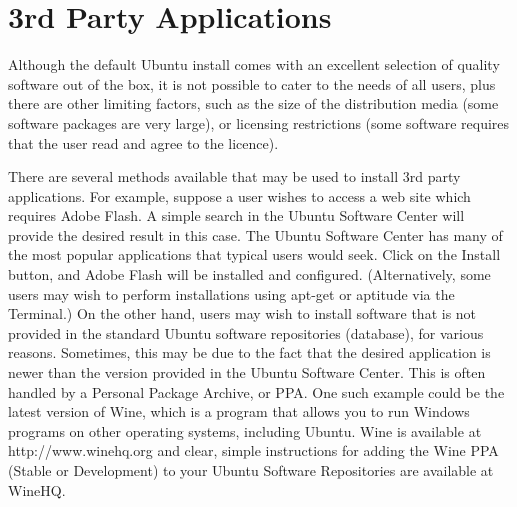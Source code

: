 \section{3rd Party Applications} \label{sect:3rdpartyapps} 
Although the default Ubuntu install comes with an excellent selection of quality software out of the box, it is not possible to cater to the needs of all users, plus there are other limiting factors, such as the size of the distribution media (some software packages are very large), or licensing restrictions (some software requires that the user read and agree to the licence). \\

\par \noindent There are several methods available that may be used to install 3rd party applications. For example, suppose a user wishes to access a web site which requires Adobe Flash. A simple search in the Ubuntu Software Center will provide the desired result in this case. The Ubuntu Software Center has many of the most popular applications that typical users would seek. Click on the Install button, and Adobe Flash will be installed and configured. (Alternatively, some users may wish to perform installations using apt-get or aptitude via the Terminal.) On the other hand, users may wish to install software that is not provided in the standard Ubuntu software repositories (database), for various reasons. Sometimes, this may be due to the fact that the desired application is newer than the version provided in the Ubuntu Software Center. This is often handled by a Personal Package Archive, or PPA. One such example could be the latest version of Wine, which is a program that allows you to run Windows programs on other operating systems, including Ubuntu. Wine is available at http://www.winehq.org and clear, simple instructions for adding the Wine PPA (Stable or Development) to your Ubuntu Software Repositories are available at WineHQ. 


